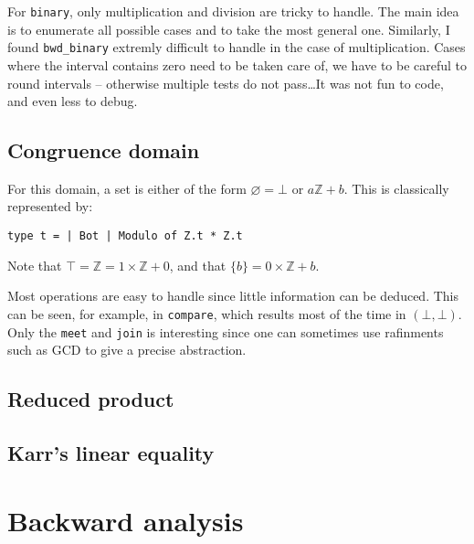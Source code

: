 \documentclass[12pt,a4paper]{article}
\begin{document}
For \texttt{binary}, only multiplication and division are tricky to handle. The main idea is to enumerate all possible cases and to take the most general one. Similarly, I found \texttt{bwd\_binary} extremly difficult to handle in the case of multiplication. Cases where the interval contains zero need to be taken care of, we have to be careful to round intervals -- otherwise multiple tests do not pass\dots It was not fun to code, and even less to debug.

\subsection{Congruence domain}
For this domain, a set is either of the form $\varnothing=\bot$ or $a\mathbb{Z}+b$. This is classically represented by:
\begin{center}
    \texttt{type t = | Bot | Modulo of Z.t * Z.t}
\end{center}
Note that $\top=\mathbb{Z}=1\times\mathbb{Z}+0$, and that $\{b\}=0\times\mathbb{Z}+b$.

Most operations are easy to handle since little information can be deduced. This can be seen, for example, in \texttt{compare}, which results most of the time in $(\bot, \bot)$. Only the \texttt{meet} and \texttt{join} is interesting since one can sometimes use rafinments such as GCD to give a precise abstraction.

\subsection{Reduced product}

\subsection{Karr's linear equality}

\section{Backward analysis}
\end{document}
